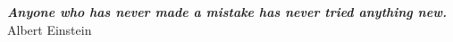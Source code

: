 \thispagestyle{empty}
\hbox{} \vfill
\begin{flushright}
\small \textit{\textbf{Anyone who has never made a mistake has never tried anything new.}}
\\ \vspace{2mm}  
\scriptsize Albert Einstein
\end{flushright}

\clearpage
\thispagestyle{empty}
\cleardoublepage
